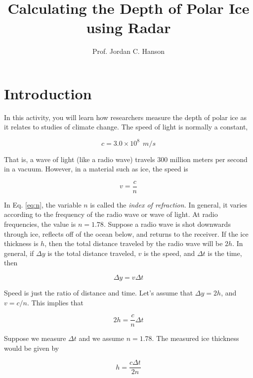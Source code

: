 \documentclass{article}
\begin{document}
\title{Calculating the Depth of Polar Ice using Radar}
\author{Prof. Jordan C. Hanson}

\maketitle

\section{Introduction}

In this activity, you will learn how researchers measure the depth of polar ice as it relates to studies of climate change.  The speed of light is normally a constant,

\begin{equation}
c = 3.0\times 10^{8}~~m/s
\end{equation}

That is, a wave of light (like a radio wave) travels 300 million meters per second in a vacuum.  However, in a material such as ice, the speed is

\begin{equation}
v = \frac{c}{n} \label{eq:n}
\end{equation}

In Eq. \ref{eq:n}, the variable $n$ is called the \textit{index of refraction.}  In general, it varies according to the frequency of the radio wave or wave of light.  At radio frequencies, the value is $n=1.78$.  Suppose a radio wave is shot downwards through ice, reflects off of the ocean below, and returns to the receiver.  If the ice thickness is $h$, then the total distance traveled by the radio wave will be $2h$.  In general, if $\Delta y$ is the total distance traveled, $v$ is the speed, and $\Delta t$ is the time, then

\begin{equation}
\Delta y = v \Delta t
\end{equation}

Speed is just the ratio of distance and time.  Let's assume that $\Delta y = 2h$, and $v = c/n$.  This implies that

\begin{equation}
2h = \frac{c}{n} \Delta t
\end{equation}

Suppose we measure $\Delta t$ and we assume $n = 1.78$.  The measured ice thickness would be given by

\begin{equation}
h = \frac{c\Delta t}{2n}
\end{equation}
\end{document}
